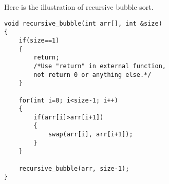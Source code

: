 \documentclass[11 pt]{article}
\begin{document}
Here is the illustration of recursive bubble sort.

\begin{lstlisting}[caption={C++ code for recursive bubble sort}, frame=shadowbox, rulesepcolor=\color{violet!70}]
void recursive_bubble(int arr[], int &size)
{
    if(size==1)
    {
        return;
        /*Use "return" in external function,
        not return 0 or anything else.*/
    }

    for(int i=0; i<size-1; i++)
    {
        if(arr[i]>arr[i+1])
        {
            swap(arr[i], arr[i+1]);
        }
    }

    recursive_bubble(arr, size-1);
}
 \end{lstlisting}
\end{document}
